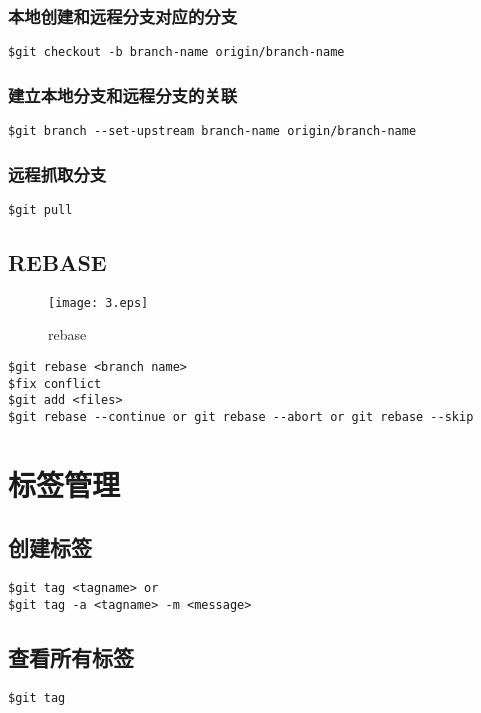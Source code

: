 \subsubsection{本地创建和远程分支对应的分支}
\begin{lstlisting}
$git checkout -b branch-name origin/branch-name
\end{lstlisting}

\subsubsection{建立本地分支和远程分支的关联}
\begin{lstlisting}
$git branch --set-upstream branch-name origin/branch-name
\end{lstlisting}

\subsubsection{远程抓取分支}
\begin{lstlisting}
$git pull
\end{lstlisting}

\subsection{REBASE}
\begin{figure}[!h]
  \centering
  \texttt{[image: 3.eps]}
  \caption{rebase}
\end{figure}

\begin{lstlisting}
$git rebase <branch name>
$fix conflict
$git add <files>
$git rebase --continue or git rebase --abort or git rebase --skip
\end{lstlisting}

\section{标签管理}
\subsection{创建标签}
\begin{lstlisting}
$git tag <tagname> or
$git tag -a <tagname> -m <message>
\end{lstlisting}

\subsection{查看所有标签}
\begin{lstlisting}
$git tag
\end{lstlisting}

